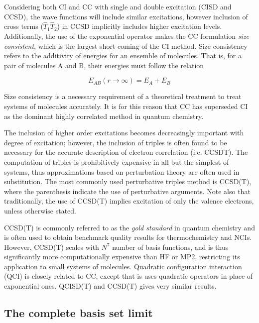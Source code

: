 \noindent Considering both CI and CC with single and double excitation (CISD
and CCSD), the wave functions will include similar excitations, however
inclusion of cross terms ($\hat{T}_1\hat{T}_2$) in CCSD implicitly includes
higher excitation levels. Additionally, the use of the exponential operator
makes the CC formulation \emph{size consistent}, which is the largest short
coming of the CI method. Size consistency refers to the additivity of energies
for an ensemble of molecules. That is, for a pair of molecules A and B, their
energies must follow the relation

\begin{equation}
  E_{AB}(r\rightarrow\infty) = E_A + E_B
\end{equation}

\noindent Size consistency is a necessary requirement of a theoretical
treatment to treat systems of molecules accurately. It is for this reason that
CC has superseded CI as the dominant highly correlated method in quantum
chemistry.

The inclusion of higher order excitations becomes decreasingly important with
degree of excitation; however, the inclusion of triples is often found to be
necessary for the accurate description of electron correlation (i.e. CCSDT).
The computation of triples is prohibitively expensive in all but the simplest
of systems, thus approximations based on perturbation theory are often used in
substitution. The most commonly used perturbative triples method is CCSD(T),
where the parenthesis indicate the use of perturbative arguments. Note also
that traditionally, the use of CCSD(T) implies excitation of only the valence
electrons, unless otherwise stated.

CCSD(T) is commonly referred to as the \emph{gold standard} in quantum
chemistry and is often used to obtain benchmark quality results for
thermochemistry and NCIs.\cite{Levine2013} However, CCSD(T) scales with $N^7$
number of basis functions, and is thus significantly more computationally
expensive than HF or MP2, restricting its application to small systems of
molecules. Quadratic configuration interaction (QCI) is closely related to CC,
except that is uses quadratic operators in place of exponential ones. QCISD(T)
and CCSD(T) gives very similar results.\cite{Pople1987}

\subsection{The complete basis set limit}

